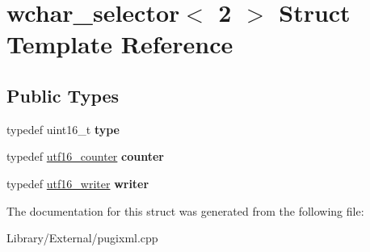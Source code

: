 \hypertarget{structwchar__selector_3_012_01_4}{}\section{wchar\+\_\+selector$<$ 2 $>$ Struct Template Reference}
\label{structwchar__selector_3_012_01_4}
\subsection*{Public Types}
\begin{DoxyCompactItemize}
\item 
\hypertarget{structwchar__selector_3_012_01_4_a60517f9b159ad60977ca7c3d2739c168}{}typedef uint16\+\_\+t {\bfseries type}\label{structwchar__selector_3_012_01_4_a60517f9b159ad60977ca7c3d2739c168}

\item 
\hypertarget{structwchar__selector_3_012_01_4_a108682c81b16127f3bec2501f02cb9d8}{}typedef \hyperlink{structutf16__counter}{utf16\+\_\+counter} {\bfseries counter}\label{structwchar__selector_3_012_01_4_a108682c81b16127f3bec2501f02cb9d8}

\item 
\hypertarget{structwchar__selector_3_012_01_4_af84979f9b8cd883798fe4e99820d6073}{}typedef \hyperlink{structutf16__writer}{utf16\+\_\+writer} {\bfseries writer}\label{structwchar__selector_3_012_01_4_af84979f9b8cd883798fe4e99820d6073}

\end{DoxyCompactItemize}


The documentation for this struct was generated from the following file\+:\begin{DoxyCompactItemize}
\item 
Library/\+External/pugixml.\+cpp\end{DoxyCompactItemize}
